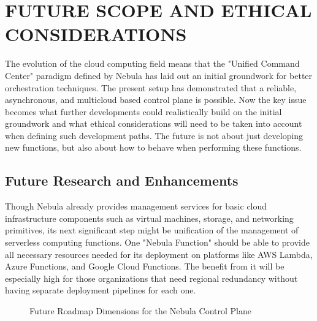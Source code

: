 \chapter{FUTURE SCOPE AND ETHICAL CONSIDERATIONS}

The evolution of the cloud computing field means that the "Unified Command Center" paradigm defined by Nebula has laid out an initial groundwork for better orchestration techniques. The present setup has demonstrated that a reliable, asynchronous, and multicloud based control plane is possible. Now the key issue becomes what further developments could realistically build on the initial groundwork and what ethical considerations will need to be taken into account when defining such development paths. The future is not about just developing new functions, but also about how to behave when performing these functions.

\section{Future Research and Enhancements}
Though Nebula already provides management services for basic cloud infrastructure components such as virtual machines, storage, and networking primitives, its next significant step might be unification of the management of serverless computing functions. One "Nebula Function" should be able to provide all necessary resources needed for its deployment on platforms like AWS Lambda, Azure Functions, and Google Cloud Functions. The benefit from it will be especially high for those organizations that need regional redundancy without having separate deployment pipelines for each one.

\begin{figure}[h]
\centering
{}
\caption{Future Roadmap Dimensions for the Nebula Control Plane}
\label{fig:future_roadmap}
\end{figure}


